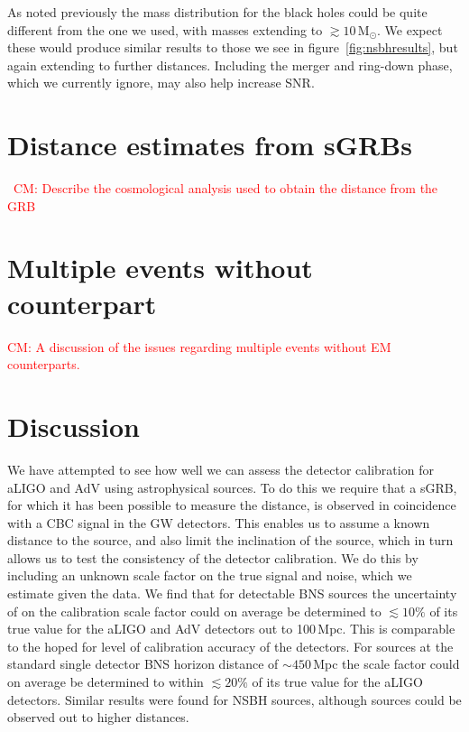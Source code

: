 \documentclass[10pt]{iopart}
\newcommand{\cm}[1]{\textcolor{red}{CM: #1}}
\begin{document}
As noted previously the mass distribution for the black holes could be quite different from the one 
we used, with masses extending to $\gtrsim 10$\,M$_{\odot}$. We expect these would produce similar 
results to those we see in figure~\ref{fig:nsbhresults}, but again extending to further distances. 
Including the merger and ring-down phase, which we currently ignore, may also help increase 
\ac{SNR}.

\section{Distance estimates from \acp{sGRB}\label{sec:cosmo}}

~\cm{Describe the cosmological analysis used to obtain the distance from the
GRB}

\section{Multiple events without counterpart\label{sec:multiple}}

\cm{A discussion of the issues regarding multiple events
without EM counterparts.}

\section{Discussion\label{sec:discussion}}

We have attempted to see how well we can assess the detector calibration for \ac{aLIGO} and 
\ac{AdV} using astrophysical sources. To do this we require that a \ac{sGRB}, for which it has 
been possible to measure the distance, is observed in coincidence with a \ac{CBC} signal in the 
\ac{GW} detectors. This enables us to assume a known distance to the source, and also limit the 
inclination of the source, which in turn allows us to test the consistency of the detector 
calibration. We do this by including an unknown scale factor on the true signal and noise, which we 
estimate given the data. We find that for detectable \ac{BNS} sources the uncertainty of on the 
calibration scale factor could on average be determined to $\lesssim 10\%$ of its true value for the 
\ac{aLIGO} and \ac{AdV} detectors out to 100\,Mpc. This is comparable to the hoped for level of 
calibration accuracy of the detectors. For sources at the standard single detector \ac{BNS} horizon 
distance of $\sim 450$\,Mpc the scale factor could on average be determined to within $\lesssim 
20\%$ of its true value for the \ac{aLIGO} detectors. Similar results were found for \ac{NSBH} 
sources, although sources could be observed out to higher distances.
\end{document}
